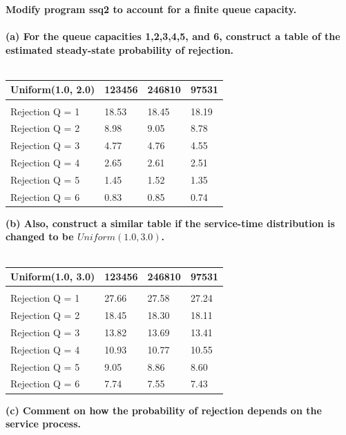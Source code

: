 \textbf{Modify program ssq2 to account for a finite queue capacity.}\\\\

\noindent \textbf{(a) For the queue capacities 1,2,3,4,5, and 6, construct a table of the estimated steady-state probability of rejection.}\\\\

\begin{table}[h]
\centering
\begin{tabular}{l|lll}
Uniform(1.0, 2.0) & 123456 & 246810 & 97531 \\
\hline\\
Rejection Q = 1   & 18.53  & 18.45  & 18.19 \\
Rejection Q = 2   & 8.98   & 9.05   & 8.78  \\
Rejection Q = 3   & 4.77   & 4.76   & 4.55  \\
Rejection Q = 4   & 2.65   & 2.61   & 2.51  \\
Rejection Q = 5   & 1.45   & 1.52   & 1.35  \\
Rejection Q = 6   & 0.83   & 0.85   & 0.74 
\end{tabular}
\end{table}

\noindent \textbf{(b) Also, construct a similar table if the service-time distribution is changed to be $Uniform(1.0, 3.0)$.}\\\\

\begin{table}[h]
\centering
\begin{tabular}{l|lll}
Uniform(1.0, 3.0) & 123456 & 246810 & 97531 \\
\hline\\
Rejection Q = 1   & 27.66  & 27.58  & 27.24 \\
Rejection Q = 2   & 18.45   & 18.30   & 18.11  \\
Rejection Q = 3   & 13.82   & 13.69   & 13.41  \\
Rejection Q = 4   & 10.93   & 10.77   & 10.55  \\
Rejection Q = 5   & 9.05   & 8.86   & 8.60  \\
Rejection Q = 6   & 7.74   &   7.55 & 7.43 
\end{tabular}
\end{table}

\noindent \textbf{(c) Comment on how the probability of rejection depends on the service process.}\\\\

